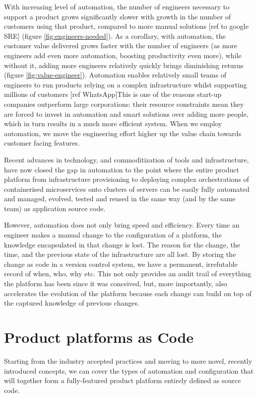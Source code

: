 \documentclass[reprint,amsmath,amssymb,aps]{revtex4-1}
\begin{document}
With increasing level of automation, the number of engineers necessary to support a product grows significantly slower with growth in the number of customers using that product, compared to more manual solutions [ref to google SRE] (figure \ref{fig:engineers-needed}). As a corollary, with automation, the customer value delivered grows faster with the number of engineers (as more engineers add even more automation, boosting productivity even more), while without it, adding more engineers relatively quickly brings diminishing returns (figure \ref{fig:value-engineer}). Automation enables relatively small teams of engineers to run products relying on a complex infrastructure whilst supporting millions of customers [ref WhatsApp]This is one of the reasons start-up companies outperform large corporations: their resource constraints mean they are forced to invest in automation and smart solutions over adding more people, which in turn results in a much more efficient system. When we employ automation, we move the engineering effort higher up the value chain towards customer facing features.

Recent advances in technology, and commoditization of tools and infrastructure, have now closed the gap in automation to the point where the entire product platform from infrastructure provisioning to deploying complex orchestrations of containerised microservices onto clusters of servers can be easily fully automated and managed, evolved, tested and reused in the same way (and by the same team) as application source code.

However, automation does not only bring speed and efficiency. Every time an engineer makes a manual change to the configuration of a platform, the knowledge encapsulated in that change is lost. The reason for the change, the time, and the previous state of the infrastructure are all lost. By storing the change as code in a version control system, we have a permanent, irrefutable record of when, who, why etc. This not only provides an audit trail of everything the platform has been since it was conceived, but, more importantly, also accelerates the evolution of the platform because each change can build on top of the captured knowledge of previous changes.


\section{Product platforms as Code}
\label{sec:ascode}

Starting from the industry accepted practices and moving to more novel, recently introduced concepts, we can cover the types of automation and configuration that will together form a fully-featured product platform entirely defined as source code.
\end{document}

